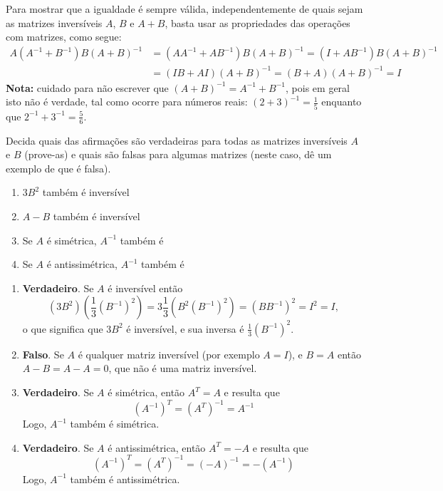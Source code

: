 \documentclass[12pt,a4paper]{article}
\begin{document}
\begin{ExerciseList}
\Answer Para mostrar que a igualdade é sempre válida, independentemente de quais sejam as matrizes inversíveis $A$, $B$ e $A+B$, basta usar as propriedades das operações com matrizes, como segue:
\begin{align*}
A(A^{-1}+B^{-1})B(A+B)^{-1}
& = (AA^{-1} + AB^{-1})B(A+B)^{-1}
  = (I + AB^{-1})B(A+B)^{-1}\\
& = (IB+AI)(A+B)^{-1}
  = (B+A)(A+B)^{-1}
  = I
\end{align*}
\textbf{Nota:} cuidado para não escrever que $(A+B)^{-1} = A^{-1} + B^{-1}$, pois em geral isto não é verdade, tal como ocorre para números reais: $(2 + 3)^{-1} = \frac{1}{5}$ enquanto que  $2^{-1} + 3^{-1} = \frac{5}{6}$.


\Exercise[title={1,8}] Decida quais das afirmações são verdadeiras para todas as matrizes inversíveis $A$ e $B$ (prove-as) e quais são falsas para algumas matrizes (neste caso, dê um exemplo de que é falsa).

\begin{multicols}{2}
\begin{enumerate}
\item $3B^2$ também é inversível
\item $A-B$ também é inversível
\item Se $A$ é simétrica, $A^{-1}$ também é
\item Se $A$ é antissimétrica, $A^{-1}$ também é
\end{enumerate}
\end{multicols}

\Answer
\begin{enumerate}
\item \textbf{Verdadeiro}. Se $A$ é inversível então
\[
(3B^2)(\frac{1}{3}(B^{-1})^2)
= 3 \frac{1}{3} (B^2(B^{-1})^2)
= (BB^{-1})^2
= I^2 = I,
\]
o que significa que $3B^2$ é inversível, e sua inversa é $\frac{1}{3}(B^{-1})^2$.
\item \textbf{Falso}. Se $A$ é qualquer matriz inversível (por exemplo $A=I$), e $B = A$ então $A-B = A-A = 0$, que não é uma matriz inversível.
\item \textbf{Verdadeiro}. Se $A$ é simétrica, então $A^T = A$ e resulta que
\[
(A^{-1})^T = (A^T)^{-1} = A^{-1}
\]
Logo, $A^{-1}$ também é simétrica.
\item \textbf{Verdadeiro}. Se $A$ é antissimétrica, então $A^T = -A$ e resulta que
\[
(A^{-1})^T = (A^T)^{-1} = (-A)^{-1} = -(A^{-1})
\]
Logo, $A^{-1}$ também é antissimétrica.
\end{enumerate}



\end{ExerciseList}
\end{document}
